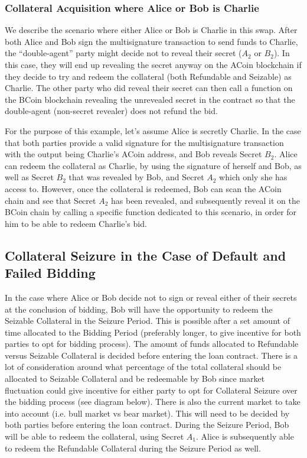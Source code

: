 \documentclass{llncs}
\begin{document}
\subsubsection{Collateral Acquisition where Alice or Bob is Charlie} 

We describe the scenario where either Alice or Bob is Charlie in this swap. After both Alice and Bob sign the multisignature transaction to send funds to Charlie, the “double-agent” party might decide not to reveal their secret ($A_2$ or $B_2$). In this case, they will end up revealing the secret anyway on the ACoin blockchain if they decide to try and redeem the collateral (both Refundable and Seizable) as Charlie. The other party who did reveal their secret can then call a function on the BCoin blockchain revealing the unrevealed secret in the contract so that the double-agent (non-secret revealer) does not refund the bid.  

For the purpose of this example, let’s assume Alice is secretly Charlie. In the case that both parties provide a valid signature for the multisignature transaction with the output being Charlie's ACoin address, and Bob reveals Secret $B_2$. Alice can redeem the collateral as Charlie, by using the signature of herself and Bob, as well as Secret $B_2$ that was revealed by Bob, and Secret $A_2$ which only she has access to. However, once the collateral is redeemed, Bob can scan the ACoin chain and see that Secret $A_2$ has been revealed, and subsequently reveal it on the BCoin chain by calling a specific function dedicated to this scenario, in order for him to be able to redeem Charlie's bid.


\subsection{Collateral Seizure in the Case of Default and Failed Bidding}

In the case where Alice or Bob decide not to sign or reveal either of their secrets at the conclusion of bidding, Bob will have the opportunity to redeem the Seizable Collateral in the Seizure Period. This is possible after a set amount of time allocated to the Bidding Period (preferably longer, to give incentive for both parties to opt for bidding process). The amount of funds allocated to Refundable versus Seizable Collateral is decided before entering the loan contract. There is a lot of consideration around what percentage of the total collateral should be allocated to Seizable Collateral and be redeemable by Bob since market fluctuation could give incentive for either party to opt for Collateral Seizure over the bidding process (see diagram below). There is also the current market to take into account (i.e. bull market vs bear market). This will need to be decided by both parties before entering the loan contract. During the Seizure Period, Bob will be able to redeem the collateral, using Secret $A_1$. Alice is subsequently able to redeem the Refundable Collateral during the Seizure Period as well.
\end{document}

